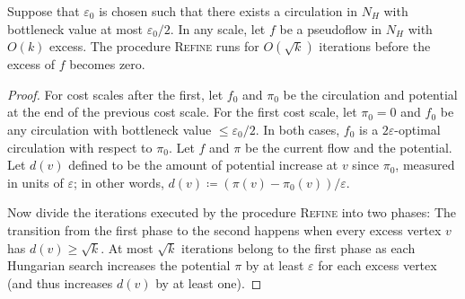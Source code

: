 \documentclass[a4paper,UKenglish]{socg-lipics-v2018}
\makeatletter
\def\etal{\emph{et~al.}}
\def\etal{\textit{et~al.}}
\def\eps{\varepsilon}
\theoremstyle{plain}
\numberwithin{figure}{section}
\def\EMPH#1{\textcolor{BrickRed}{{\emph{#1}}}}
\def\n@te#1{\textsf{\boldmath \textbf{$\langle\!\langle$#1$\rangle\!\rangle$}}\leavevmode}
\def\note#1{\textcolor{red}{\n@te{#1}}}
\renewcommand{\note}[1]{} %
\makeatother
\begin{document}
\begin{lemmarep}
\label{lemma:goldberg_refine_iterations}
Suppose that $\eps_0$ is chosen such that there exists a circulation in $N_H$
with bottleneck value at most $\eps_0/2$.
In any scale, let $f$ be a pseudoflow in $N_H$ with $O(k)$ excess.
The procedure \textsc{Refine} runs for $O(\sqrt{k})$ iterations
before the excess of $f$ becomes zero.
\end{lemmarep}

\begin{proof}
For cost scales after the first, let $f_0$ and $\pi_0$ be the circulation and
potential at the end of the previous cost scale.
For the first cost scale, let $\pi_0 = 0$ and $f_0$ be any circulation with bottleneck value $\leq \eps_0/2$.
In both cases, $f_0$ is a $2\eps$-optimal circulation with respect to $\pi_0$.
Let $f$ and $\pi$ be the current flow and the potential.
Let \EMPH{$d(v)$} defined to be the amount of potential increase at $v$ since $\pi_0$, measured in units of $\eps$; in other words, $d(v) \coloneqq (\pi(v) - \pi_0(v)) / \eps$.
%

Now divide the iterations executed by
the procedure \textsc{Refine}
into two phases:  The transition from the first phase to the second happens when every excess vertex $v$ has $d(v) \ge \sqrt{k}$.
%
At most $\sqrt{k}$ iterations belong to
the first phase as each Hungarian search increases the potential $\pi$ by at least $\eps$ for each excess vertex (and thus increases $d(v)$ by at least one).


\end{proof}
\end{document}
